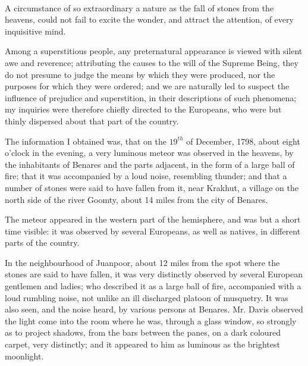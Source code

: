 \documentclass[a4paper, 12pt, oneside]{article}
\begin{document}
\paragraph{}
A circumstance of so extraordinary a nature as the fall of stones from the heavens, could not fail to excite the wonder, and attract the attention, of every inquisitive mind.

Among a superstitious people, any preternatural appearance is viewed with silent awe and reverence; attributing the causes to the will of the Supreme Being, they do not presume to judge the means by which they were produced, nor the purposes for which they were ordered; and we are naturally led to suspect the influence of prejudice and superstition, in their descriptions of such phenomena; my inquiries were therefore chiefly directed to the Europeans, who were but thinly dispersed about that part of the country.

The information I obtained was, that on the $19^{th}$ of December, 1798, about eight o'clock in the evening, a very luminous meteor was observed in the heavens, by the inhabitants of Benares and the parts adjacent, in the form of a large ball of fire; that it was accompanied by a loud noise, resembling thunder; and that a number of stones were said to have fallen from it, near Krakhut, a village on the north side of the river Goomty, about 14 miles from the city of Benares.

The meteor appeared in the western part of the hemisphere, and was but a short time visible: it was observed by several Europeans, as well as natives, in different parts of the country.

In the neighbourhood of Juanpoor, about 12 miles from the spot where the stones are said to have fallen, it was very distinctly observed by several European gentlemen and ladies; who described it as a large ball of fire, accompanied with a loud rumbling noise, not unlike an ill discharged platoon of musquetry. It was also seen, and the noise heard, by various persons at Benares. Mr. Davis observed the light come into the room where he was, through a glass window, so strongly as to project shadows, from the bars between the panes, on a dark coloured carpet, very distinctly; and it appeared to him as luminous as the brightest moonlight.
\end{document}
